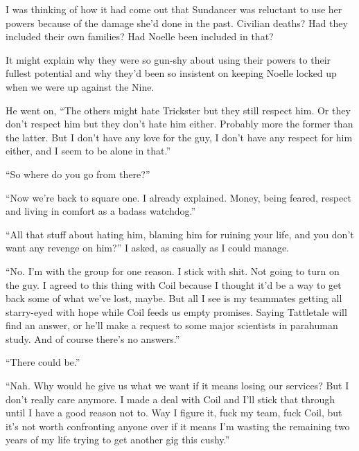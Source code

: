 I was thinking of how it had come out that Sundancer was reluctant to use her powers because of the damage she'd done in the past.  Civilian deaths?  Had they included their own families?  Had Noelle been included in that?



It might explain why they were so gun-shy about using their powers to their fullest potential and why they'd been so insistent on keeping Noelle locked up when we were up against the Nine.



He went on, ``The others might hate Trickster but they still respect him.  Or they don't respect him but they don't hate him either.  Probably more the former than the latter.  But I don't have any love for the guy, I don't have any respect for him either, and I seem to be alone in that.''



``So where do you go from there?''



``Now we're back to square one.  I already explained.  Money, being feared, respect and living in comfort as a badass watchdog.''



``All that stuff about hating him, blaming him for ruining your life, and you don't want any revenge on him?'' I asked, as casually as I could manage.



``No.  I'm with the group for one reason.  I stick with shit.  Not going to turn on the guy.  I agreed to this thing with Coil because I thought it'd be a way to get back some of what we've lost, maybe.  But all I see is my teammates getting all starry-eyed with hope while Coil feeds us empty promises.  Saying Tattletale will find an answer, or he'll make a request to some major scientists in parahuman study.  And of course there's no answers.''



``There could be.''



``Nah.  Why would he give us what we want if it means losing our services?  But I don't really care anymore.  I made a deal with Coil and I'll stick that through until I have a good reason not to.  Way I figure it, fuck my team, fuck Coil, but it's not worth confronting anyone over if it means I'm wasting the remaining two years of my life trying to get another gig this cushy.''



